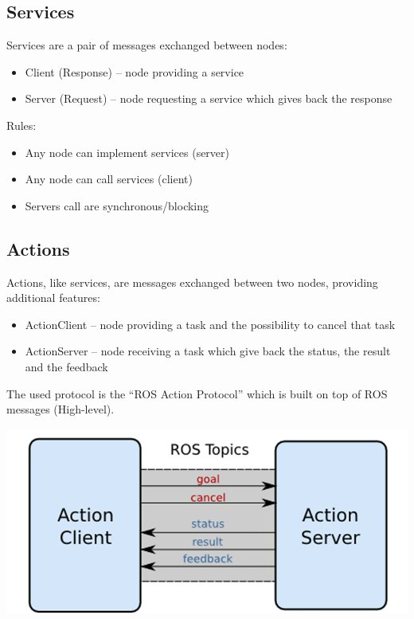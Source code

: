         \subsection{Services}
            Services are a pair of messages exchanged between nodes:
            \begin{itemize}
                \item Client (Response) – node providing a service
                \item Server (Request) – node requesting a service which gives back the response
            \end{itemize}
            Rules:
            \begin{itemize}
                \item Any node can implement services (server)
                \item Any node can call services (client)
                \item Servers call are synchronous/blocking
            \end{itemize}



        \subsection{Actions}
            Actions, like services, are messages exchanged between two nodes, providing additional features:
            \begin{itemize}
                \item ActionClient – node providing a task and the possibility to cancel that task
                \item ActionServer – node receiving a task which give back the status, the result and the feedback
            \end{itemize}
            The used protocol is the “ROS Action Protocol” which is built on top of ROS messages (High-level).
            
            \includegraphics[width=16cm]{pictures/comm_actions.png}
            
